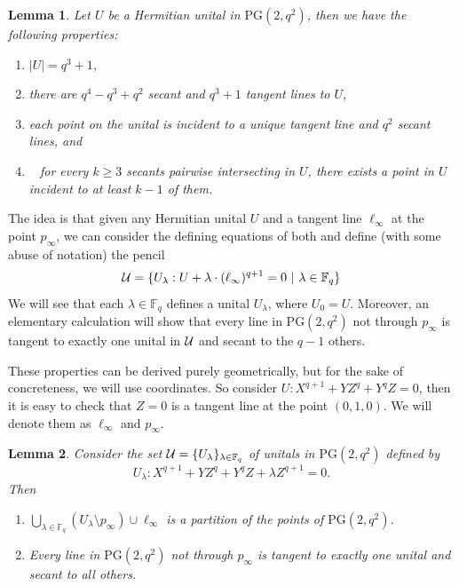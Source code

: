 \documentclass[12pt]{article}
\def\Fq{{\mathbb{F}_q}}
\newcommand{\PG}{\mathrm{PG}}
\newcommand{\cU}{{\cal U}}
\newtheorem{lemma}{Lemma}
\theoremstyle{definition}
\begin{document}
	\begin{lemma}\label{lem:unitalcombinatorics}
		Let $U$ be a Hermitian unital in $\PG(2,q^2)$, then we have the following properties:
		\begin{enumerate}
			\item $|U| = q^3+1$,
			\item there are $q^4-q^3+q^2$ secant and $q^3+1$ tangent lines to $U$,
			\item each point on the unital is incident to a unique tangent line and $q^2$ secant lines, and 
			\item \emph{~\cite{mubayi2024order}} for every $k\geq 3$ secants pairwise intersecting in $U$, there exists a point in $U$ incident to at least $k-1$ of them.
		\end{enumerate}
	\end{lemma}
	
	The idea is that given any Hermitian unital $U$ and a tangent line $\ell_\infty$ at the point $p_\infty$, we can consider the defining equations of both and define (with some abuse of notation) the pencil 
	\[\cU = \{U_\lambda:U+\lambda\cdot(\ell_\infty)^{q+1} = 0 \,\, | \,\, \lambda \in \Fq\}\] 
	We will see that each $\lambda \in \Fq$ defines a unital $U_\lambda$, where $U_0 = U$. Moreover, an elementary calculation will show that every line in $\PG(2,q^2)$ not through $p_\infty$ is tangent to exactly one unital in $\cU$ and secant to the $q-1$ others.
	
	These properties can be derived purely geometrically, but for the sake of concreteness, we will use coordinates. So consider $U:X^{q+1}+YZ^q+Y^qZ=0$, then it is easy to check that $Z = 0$ is a tangent line at the point $(0,1,0)$. We will denote them as $\ell_\infty$ and $p_\infty$.
	
	\begin{lemma}\label{lem:unitalpencil}
		Consider the set $\cU = \{U_\lambda\}_{\lambda \in \Fq}$ of unitals in $\PG(2,q^2)$ defined by 
		\[U_\lambda:X^{q+1}+YZ^q+Y^qZ+\lambda Z^{q+1} = 0.\]
		Then 
		\begin{enumerate}
			\item $\bigcup_{\lambda \in \Fq}\left(U_\lambda \setminus p_\infty\right) \cup \ell_\infty$ is a partition of the points of $\PG(2,q^2)$.
			\item Every line in $\PG(2,q^2)$ not through $p_\infty$ is tangent to exactly one unital and secant to all others.
		\end{enumerate}
	\end{lemma}
	
\end{document}
